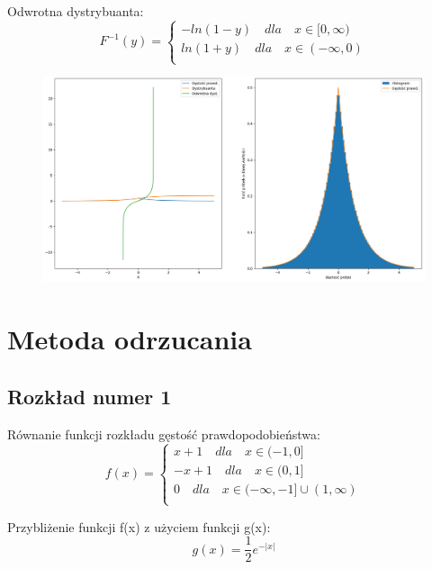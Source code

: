 \documentclass[12pt,a4paper]{article}
\begin{document}
  Odwrotna dystrybuanta:
    \begin{equation}
      F^{-1}(y) = \begin{cases}
            -ln(1 - y) \quad dla \quad x  \in [0, \infty)\\
            ln(1 + y) \quad dla \quad x  \in (-\infty, 0)\\
          \end{cases}   
    \end{equation}

  \begin{figure}[H]
    \centering
    \includegraphics[width=1\textwidth]{figures/Figure_19.png}
    \label{fig:19}
  \end{figure}


\section{Metoda odrzucania}
  \subsection{Rozkład numer 1}
    
  Równanie funkcji rozkładu gęstość prawdopodobieństwa:
  \begin{equation}
    f(x) = \begin{cases}
        x + 1 \quad dla \quad x  \in (-1, 0]\\
        -x + 1 \quad dla \quad x  \in (0, 1]\\
        0 \quad dla \quad x  \in (-\infty, -1] \cup (1, \infty)\\
      \end{cases}   
  \end{equation}

  Przybliżenie funkcji f(x) z użyciem funkcji g(x):
  \begin{equation}
    g(x) = \frac{1}{2} e^{-|x|}
  \end{equation}
\end{document}
